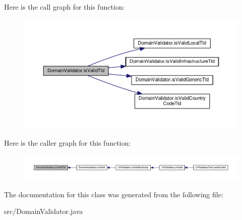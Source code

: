 Here is the call graph for this function\+:\nopagebreak
\begin{figure}[H]
\begin{center}
\leavevmode
\includegraphics[width=350pt]{classDomainValidator_aa05e0803e9f7390577f072fbeac0afb6_cgraph}
\end{center}
\end{figure}




Here is the caller graph for this function\+:
\nopagebreak
\begin{figure}[H]
\begin{center}
\leavevmode
\includegraphics[width=350pt]{classDomainValidator_aa05e0803e9f7390577f072fbeac0afb6_icgraph}
\end{center}
\end{figure}




The documentation for this class was generated from the following file\+:\begin{DoxyCompactItemize}
\item 
src/Domain\+Validator.\+java\end{DoxyCompactItemize}
